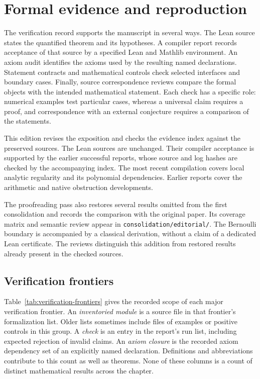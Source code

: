 \section{Formal evidence and reproduction}
\label{sec:verification}

The verification record supports the manuscript in several ways. The Lean source states the quantified theorem and its hypotheses. A
compiler report records acceptance of that source by a specified Lean and
Mathlib environment. An axiom audit identifies the axioms used by the resulting
named declarations. Statement contracts and mathematical controls check
selected interfaces and boundary cases. Finally, source correspondence reviews
compare the formal objects with the intended mathematical statement. Each check has a specific role: numerical examples test particular cases,
whereas a universal claim requires a proof, and correspondence with an
external conjecture requires a comparison of the statements.

This edition revises the exposition and checks the evidence index against
the preserved sources. The Lean sources are unchanged. Their compiler
acceptance is supported by the earlier successful reports, whose source and
log hashes are checked by the accompanying index. The most recent compilation
covers local analytic regularity and its polynomial dependencies. Earlier
reports cover the arithmetic and native obstruction developments.

The proofreading pass also restores several results omitted from the first
consolidation and records the comparison with the original paper. Its
coverage matrix and semantic review appear in
\texttt{consolidation/editorial/}. The Bernoulli boundary is accompanied by
a classical derivation, without a claim of a dedicated Lean certificate.
The reviews distinguish this addition from restored results already present
in the checked sources.

\subsection{Verification frontiers}

Table~\ref{tab:verification-frontiers} gives the recorded scope of each major
verification frontier. An \emph{inventoried module} is a source file in that
frontier's formalization list. Older lists sometimes include files of examples
or positive controls in this group. A \emph{check} is an entry in the report's
run list, including expected rejection of invalid claims. An \emph{axiom
closure} is the recorded axiom dependency set of an explicitly named
declaration. Definitions and abbreviations contribute to this count as well
as theorems. None of these columns is a count of distinct mathematical results
across the chapter.

